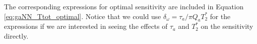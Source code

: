 The corresponding expressions for optimal sensitivity are included in Equation \eqref{eq:gaNN_Ttot_optimal}. 
Notice that we could use $\delta_\omega = \tau_a/\pi Q_a T_2^*$ for the expressions if we are interested in seeing the effects of $\tau_a$ and $T_2^*$ on the sensitivity directly. 




    
    


    
    
